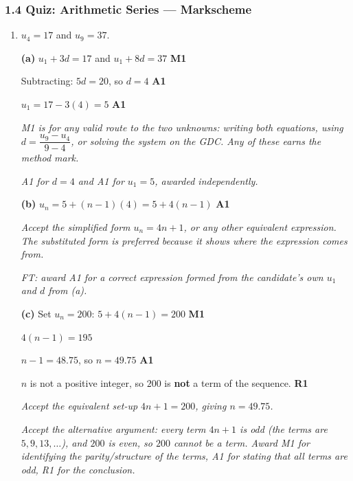 \documentclass[12pt, twoside]{article}
\begin{document}
\subsubsection*{1.4 Quiz: Arithmetic Series --- Markscheme}

\begin{enumerate}[itemsep=0.3cm]

\item[1.] [Maximum mark: 7]

$u_{4} = 17$ and $u_{9} = 37$.

\medskip

\textbf{(a)} $u_{1} + 3d = 17$ \quad and \quad $u_{1} + 8d = 37$
\hfill \textbf{M1}

Subtracting: $5d = 20$, so $d = 4$ \hfill \textbf{A1}

$u_{1} = 17 - 3(4) = 5$ \hfill \textbf{A1}

\emph{M1 is for any valid route to the two unknowns: writing both
equations, using $d = \dfrac{u_{9} - u_{4}}{9 - 4}$, or solving the
system on the GDC. Any of these earns the method mark.}

\emph{A1 for $d = 4$ and A1 for $u_{1} = 5$, awarded independently.}

\medskip

\textbf{(b)} $u_{n} = 5 + (n - 1)(4) = 5 + 4(n - 1)$ \hfill \textbf{A1}

\emph{Accept the simplified form $u_{n} = 4n + 1$, or any other equivalent
expression. The substituted form is preferred because it shows where the
expression comes from.}

\emph{FT: award A1 for a correct expression formed from the
candidate's own $u_{1}$ and $d$ from (a).}

\medskip

\textbf{(c)} Set $u_{n} = 200$: \quad $5 + 4(n - 1) = 200$
\hfill \textbf{M1}

$4(n - 1) = 195$

$n - 1 = 48.75$, so $n = 49.75$ \hfill \textbf{A1}

$n$ is not a positive integer, so $200$ is \textbf{not} a term of the
sequence. \hfill \textbf{R1}

\emph{Accept the equivalent set-up $4n + 1 = 200$, giving $n = 49.75$.}

\emph{Accept the alternative argument: every term $4n + 1$ is odd
(the terms are $5, 9, 13, \ldots$), and $200$ is even, so $200$
cannot be a term. Award M1 for identifying the parity/structure of the
terms, A1 for stating that all terms are odd, R1 for the
conclusion.}


\end{enumerate}
\end{document}
